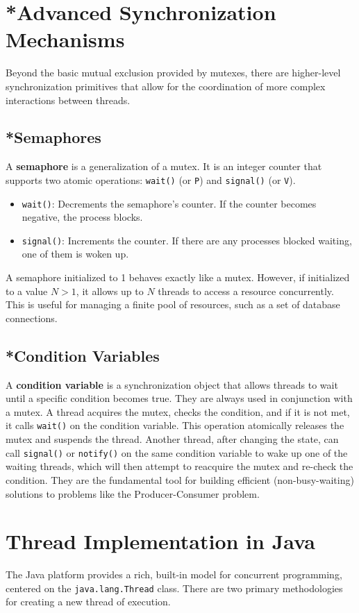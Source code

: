 \section*{*Advanced Synchronization Mechanisms}
Beyond the basic mutual exclusion provided by mutexes, there are higher-level synchronization primitives that allow for the coordination of more complex interactions between threads.

\subsection*{*Semaphores}
A \textbf{semaphore} is a generalization of a mutex. It is an integer counter that supports two atomic operations: \texttt{wait()} (or \texttt{P}) and \texttt{signal()} (or \texttt{V}).
\begin{itemize}
    \item \texttt{wait()}: Decrements the semaphore's counter. If the counter becomes negative, the process blocks.
    \item \texttt{signal()}: Increments the counter. If there are any processes blocked waiting, one of them is woken up.
\end{itemize}
A semaphore initialized to 1 behaves exactly like a mutex. However, if initialized to a value $N > 1$, it allows up to $N$ threads to access a resource concurrently. This is useful for managing a finite pool of resources, such as a set of database connections.

\subsection*{*Condition Variables}
A \textbf{condition variable} is a synchronization object that allows threads to wait until a specific condition becomes true. They are always used in conjunction with a mutex. A thread acquires the mutex, checks the condition, and if it is not met, it calls \texttt{wait()} on the condition variable. This operation atomically releases the mutex and suspends the thread. Another thread, after changing the state, can call \texttt{signal()} or \texttt{notify()} on the same condition variable to wake up one of the waiting threads, which will then attempt to reacquire the mutex and re-check the condition. They are the fundamental tool for building efficient (non-busy-waiting) solutions to problems like the Producer-Consumer problem.

\section{Thread Implementation in Java}
The Java platform provides a rich, built-in model for concurrent programming, centered on the \texttt{java.lang.Thread} class. There are two primary methodologies for creating a new thread of execution.

